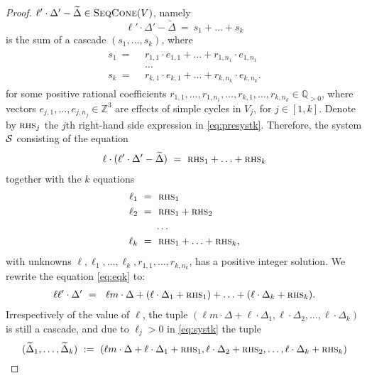 \documentclass[a4paper, UKenglish, cleveref, autoref, thm-restate]{lipics-v2021}
\newcommand{\Z}{\mathbb{Z}}
\newcommand{\Q}{\mathbb{Q}}
\newcommand{\Qpos}{\Q_{>0}}
\newcommand{\setfromto}[2]{[#1, #2]}
\newcommand{\setto}[1]{\setfromto 1 {#1}}
\newcommand{\seqcone}[1]{\textsc{SeqCone}(#1)}
\newcommand{\rhs}{\textsc{rhs}}
\begin{document}
\begin{appendixproof}
\begin{proof}
$\ell'\cdot\Delta'-\widetilde \Delta \in \seqcone V$, namely
\[
\ell'\cdot\Delta' - \widetilde \Delta \ = \ s_1  +  \ldots  +  s_k
\]
is the sum of a cascade $(s_1, \ldots, s_k)$, where
\begin{align} \label{eq:presystk} 
\begin{aligned}
s_1 \ =  \ & \ r_{1,1} \cdot e_{1,1} + \ldots + r_{1,n_1} \cdot e_{1,n_1} \\
 & \ \ldots  \\
s_k \ = \ & \ r_{k,1} \cdot e_{k,1} + \ldots + r_{k,n_k} \cdot e_{k,n_k}.
\end{aligned}
\end{align}
for some positive rational coefficients $r_{1,1}, \ldots, r_{1,n_1}, \ldots, r_{k, 1}, \ldots, r_{k,n_k}\in \Qpos$,
where vectors $e_{j,1}, \ldots, e_{j,n_j}\in\Z^3$ are effects of simple cycles in $V_j$, for $j\in\setto k$. Denote by $\rhs_j$ the $j$th right-hand side expression in \eqref{eq:presystk}.
Therefore, the system $\cal S$ consisting of the equation
\begin{align} \label{eq:eqk}
\ell \cdot (\ell'\cdot\Delta'-\widetilde\Delta)  \ = \ \rhs_1  +  \ldots +  \rhs_k
\end{align}
together with the $k$ equations
\begin{align} \label{eq:systk}
\begin{aligned}
\ell_1 \ = \ & \ \rhs_1 \\
\ell_2 \ = \ & \ \rhs_1  +  \rhs_2 \\
& \ldots \\
\ell_k \ = \ & \ \rhs_1  +  \ldots  +  \rhs_k,
\end{aligned}
\end{align}
with unknowns $\ell, \ell_1, \ldots, \ell_k, r_{1,1}, \ldots, r_{k,n_k}$, has a positive integer solution. We rewrite the equation \eqref{eq:eqk} to:
\begin{align} 
\begin{aligned}
\label{eq:syst}
\ell \ell'\cdot \Delta'  \ = \ \ \ell m \cdot \Delta +   (\ell\cdot \Delta_1 + \rhs_1) + \ldots + (\ell \cdot \Delta_k + \rhs_k).
\end{aligned}
\end{align}
Irrespectively of the value of $\ell$,
the tuple 
$(\ell m\cdot\Delta + \ell\cdot\Delta_1, \ell\cdot\Delta_2, \ldots, \ell\cdot\Delta_k)$ is still a cascade,
and due to $\ell_j>0$ in \eqref{eq:systk} the tuple
\[
(\widetilde\Delta_1, \ldots, \widetilde\Delta_k) \ := \ (\ell m\cdot\Delta + \ell\cdot\Delta_1 + \rhs_1, \ell\cdot\Delta_2 + \rhs_2, \ldots, \ell\cdot\Delta_k+\rhs_k)
\]
\end{proof}
\end{appendixproof}
\end{document}
